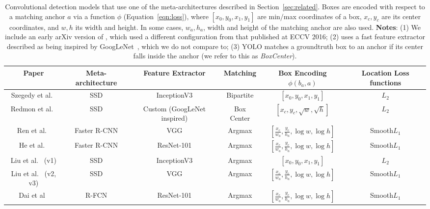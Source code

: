 \documentclass[10pt,twocolumn,letterpaper]{article}
\begin{document}
\begin{table*}
\begin{center}
{\footnotesize
\begin{tabular}{c|c|c|c|c|c}
Paper & Meta-architecture & Feature Extractor & Matching & Box Encoding $\phi(b_a, a)$ & Location Loss functions \\
\hline
Szegedy et al.~\cite{szegedy2014scalable} & SSD & InceptionV3 & Bipartite & $[x_0, y_0, x_1, y_1]$ & $L_2$ \\
Redmon et al.~\cite{redmon2015you} & SSD & Custom (GoogLeNet inspired) & Box Center  & $[x_c, y_c, \sqrt{w}, \sqrt{h}]$ & $L_2$\\
Ren et al.~\cite{ren2015faster} & Faster R-CNN & VGG  & Argmax & $[\frac{x_c}{w_a}, \frac{y_c}{h_a}, \log w, \log h]$ & Smooth$L_1$\\
He et al.~\cite{he2015deep} & Faster R-CNN & ResNet-101  & Argmax & $[\frac{x_c}{w_a}, \frac{y_c}{h_a}, \log w, \log h]$ & Smooth$L_1$\\
Liu et al.~\cite{liu2015ssd} (v1) & SSD & InceptionV3  & Argmax & $[x_0, y_0, x_1, y_1]$  & $L_2$\\
Liu et al.~\cite{liu2015ssd} (v2, v3) & SSD & VGG  & Argmax & $[\frac{x_c}{w_a}, \frac{y_c}{h_a}, \log w, \log h]$ & Smooth$L_1$ \\
Dai et al~\cite{dai2016r} & R-FCN & ResNet-101  & Argmax & $[\frac{x_c}{w_a}, \frac{y_c}{h_a}, \log w, \log h]$ & Smooth$L_1$ \\
\end{tabular}
}
\vspace{1mm}
\caption{
\footnotesize Convolutional  detection models that use one of the meta-architectures described in Section~\ref{sec:related}.  Boxes are encoded with respect to a matching anchor $a$ via a
function $\phi$ (Equation~\ref{eqn:loss}), where $[x_0, y_0, x_1, y_1]$ are min/max coordinates of a box, $x_c, y_c$ are its center coordinates, and $w, h$ its width and height.  In some cases, $w_a, h_a$,  width and height of the matching anchor are also used.
{\bf Notes}: (1) We include an early arXiv version of \cite{liu2015ssd}, which used a different configuration from that published at ECCV 2016; (2) \cite{redmon2015you} uses a fast feature extractor described as being inspired by GoogLeNet~\cite{szegedy2015going}, which we do not compare to; (3) YOLO matches a groundtruth box to an anchor if its center falls inside the anchor (we refer to this as \emph{BoxCenter}).
}\vspace{-6mm}
\label{tab:paper_comparison}
\end{center}
\end{table*}
\end{document}
